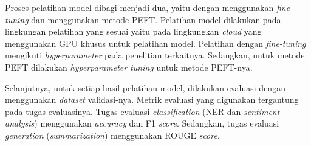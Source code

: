 Proses pelatihan model dibagi menjadi dua, yaitu dengan menggunakan \textit{fine-tuning} dan menggunakan metode PEFT. Pelatihan model  dilakukan pada lingkungan pelatihan yang sesuai yaitu pada lingkungkan \textit{cloud} yang menggunakan GPU khusus untuk pelatihan model. Pelatihan dengan \textit{fine-tuning} mengikuti \textit{hyperparameter} pada penelitian terkaitnya. Sedangkan, untuk metode PEFT  dilakukan \textit{hyperparameter tuning} untuk metode PEFT-nya.

Selanjutnya, untuk setiap hasil pelatihan model, dilakukan evaluasi dengan menggunakan \textit{dataset} validasi-nya. Metrik evaluasi yang digunakan tergantung pada tugas evaluasinya. Tugas evaluasi \textit{classification} (NER dan \textit{sentiment analysis})  menggunakan \textit{accuracy} dan F1 \textit{score}. Sedangkan, tugas evaluasi \textit{generation} (\textit{summarization})  menggunakan ROUGE \textit{score}.

